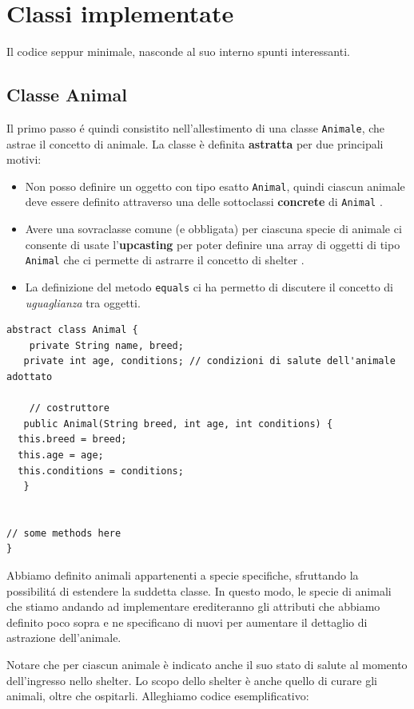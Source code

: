 \documentclass[a4paper,11pt]{article}
\begin{document}
\section{Classi implementate}
Il codice seppur minimale, nasconde al suo interno spunti interessanti.


\subsection{Classe Animal}

Il primo passo \'e quindi consistito nell'allestimento di una classe {\tt Animale}, che astrae il concetto di animale. La classe è definita \textbf{astratta} per due principali motivi:
\begin{itemize}
    \item Non posso definire un oggetto con tipo esatto {\tt Animal}, quindi ciascun animale deve essere definito attraverso una delle sottoclassi \textbf{concrete} di {\tt Animal} \cite{java}.
    \item Avere una sovraclasse comune (e obbligata) per ciascuna specie di animale ci consente di usate l'\textbf{upcasting} per poter definire una array di oggetti di tipo {\tt Animal} che ci permette di astrarre il concetto di shelter \cite{java_book}.
    \item La definizione del metodo {\tt equals} ci ha permetto di discutere il concetto di {\em uguaglianza} tra oggetti.
\end{itemize}

\begin{lstlisting}[caption={Animal.java -- Allestimento della classe Animale}]
abstract class Animal {
 	private String name, breed;
   private int age, conditions; // condizioni di salute dell'animale adottato

	// costruttore
   public Animal(String breed, int age, int conditions) {
  this.breed = breed;
  this.age = age;
  this.conditions = conditions;
   }


// some methods here 
}

\end{lstlisting}

Abbiamo definito animali appartenenti a specie specifiche, sfruttando la possibilit\'a di estendere la suddetta classe. In questo modo, le specie di animali che stiamo andando ad implementare erediteranno gli attributi che abbiamo definito poco sopra e ne specificano di nuovi per aumentare il dettaglio di astrazione dell'animale.

Notare che per ciascun animale è indicato anche il suo stato di salute al momento dell'ingresso nello shelter. Lo scopo dello shelter è anche quello di curare gli animali, oltre che ospitarli. Alleghiamo codice esemplificativo:
\end{document}
